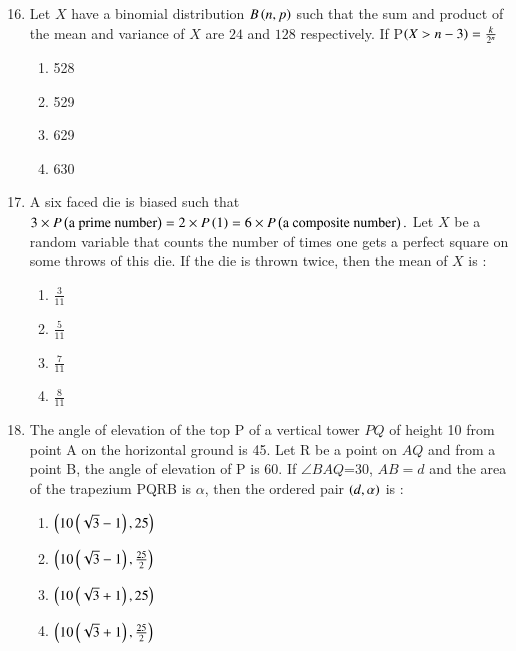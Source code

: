 \documentclass[journal]{IEEEtran}
\begin{document}
\begin{enumerate}
\setcounter{enumi}{15}
 
    \item Let $X$ have  a binomial distribution $B\left(n,p\right)$ such that the sum and product of the mean and variance of $X$  are $24$ and $128$ respectively. If P$\left(X>n-3\right)=\frac{k}{2^n}$

        \begin{multicols}{4}
            \begin{enumerate}
                \item 528
                \item 529
                \item 629
                \item 630
            \end{enumerate}
        \end{multicols}

    \item A six faced die is biased such that $3\times P\left(\text{a prime number}\right)=2\times P\left(1\right)=6\times P\left(\text{a composite number}\right).$ Let $X$ be a random variable that counts the number of times one gets a perfect square on some throws of this die. If the die is thrown twice, then the mean of $X$ is :

		\begin{multicols}{1}
			\begin{enumerate}
				\item $\frac{3}{11}$
				\item $\frac{5}{11}$
				\item $\frac{7}{11}$
				\item $\frac{8}{11}$
			\end{enumerate}
		\end{multicols}

    \item The angle of elevation of the top P of a vertical tower $PQ$ of height 10 from point A on the horizontal ground is 45\textdegree. Let R be a point on $AQ$ and from a point B, the angle of elevation of P is 60\textdegree. If $\angle BAQ$=30\textdegree, $AB=d$ and the area of the trapezium PQRB is $\alpha$, then the ordered pair $\left(d,\alpha\right)$ is :
        \begin{multicols}{1}
            \begin{enumerate}
                \item $\left(10\left(\sqrt{3}-1\right),25\right)$
                \item $\left(10\left(\sqrt{3}-1\right),\frac{25}{2}\right)$
                \item $\left(10\left(\sqrt{3}+1\right),25\right)$
                \item $\left(10\left(\sqrt{3}+1\right),\frac{25}{2}\right)$
            \end{enumerate}
        \end{multicols}


\end{enumerate}
\end{document}
